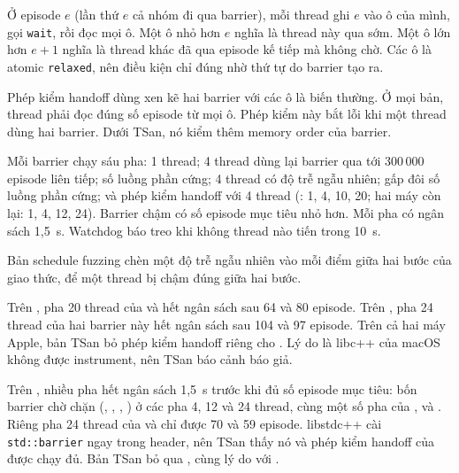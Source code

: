 \label{sec:corr:barrier}

Ở episode $e$ (lần thứ $e$ cả nhóm đi qua barrier), mỗi thread ghi $e$ vào ô của mình, gọi
\texttt{wait}, rồi đọc mọi ô. Một ô nhỏ hơn $e$ nghĩa là thread này qua sớm. Một ô lớn hơn $e+1$ nghĩa
là thread khác đã qua episode kế tiếp mà không chờ. Các ô là atomic \texttt{relaxed}, nên điều kiện chỉ
đúng nhờ thứ tự do barrier tạo ra.

Phép kiểm handoff dùng xen kẽ hai barrier với các ô là biến thường. Ở mọi bản, thread phải đọc đúng số
episode từ mọi ô. Phép kiểm này bắt lỗi khi một thread dùng hai barrier. Dưới TSan, nó kiểm thêm memory
order của barrier.

Mỗi barrier chạy sáu pha: 1 thread; 4 thread dùng lại barrier qua tới 300\,000 episode liên tiếp; số luồng
phần cứng; 4 thread có độ trễ ngẫu nhiên; gấp đôi số luồng phần cứng; và phép kiểm handoff với 4 thread
(: 1, 4, 10, 20; hai máy còn lại: 1, 4, 12, 24). Barrier chậm có số episode mục tiêu
nhỏ hơn. Mỗi pha có ngân sách 1,5~s. Watchdog báo treo khi không thread nào tiến trong 10~s.

Bản schedule fuzzing chèn một độ trễ ngẫu nhiên vào mỗi điểm giữa hai bước của giao thức, để một
thread bị chậm đúng giữa hai bước.

Trên , pha 20 thread của  và  hết ngân sách sau 64 và 80
episode. Trên , pha 24 thread của hai barrier này hết ngân sách sau 104 và 97 episode.
Trên cả hai máy Apple, bản TSan bỏ phép kiểm handoff riêng cho . Lý do là libc++ của macOS không
được instrument, nên TSan báo cảnh báo giả.

Trên , nhiều pha hết ngân sách 1,5~s trước khi đủ số episode mục tiêu: bốn barrier chờ
chặn (, , , ) ở các pha 4, 12
và 24 thread, cùng một số pha của ,  và . Riêng
pha 24 thread của  và  chỉ được 70 và 59 episode. libstdc++ cài
\texttt{std::barrier} ngay trong header, nên TSan thấy nó và phép kiểm handoff của 
được chạy đủ. Bản TSan bỏ qua , cùng lý do với .

